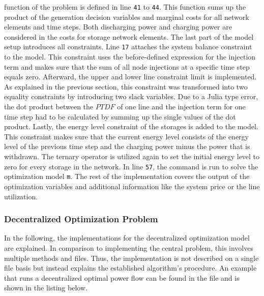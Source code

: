 function of the problem is defined in line \texttt{41} to \texttt{44}. This function sums up the product of the generation decision variables and marginal costs for all network elements and time steps. Both discharging power and charging power are considered in the costs for storage network elements. The last part of the model setup introduces all constraints. Line \texttt{17} attaches the system balance constraint to the model. This constraint uses the before-defined expression for the injection term and makes sure that the sum of all node injections at a specific time step equals zero. Afterward, the upper and lower line constraint limit is implemented. As explained in the previous section, this constraint was transformed into two equality constraints by introducing two slack variables. Due to a Julia type error, the dot product between the $PTDF$ of one line and the injection term for one time step had to be calculated by summing up the single values of the dot product. Lastly, the energy level constraint of the storages is added to the model. This constraint makes sure that the current energy level consists of the energy level of the previous time step and the charging power minus the power that is withdrawn. The ternary operator is utilized again to set the initial energy level to zero for every storage in the network. In line \texttt{57}, the command is run to solve the optimization model \lstinline[language=julia]{m}. The rest of the implementation covers the output of the optimization variables and additional information like the system price or the line utilization.


\subsubsection{Decentralized Optimization Problem}

In the following, the implementations for the decentralized optimization model are explained. In comparison to implementing the central problem, this involves multiple methods and files. Thus, the implementation is not described on a single file basis but instead explains the established algorithm's procedure. An example that runs a decentralized optimal power flow can be found in the file  and is shown in the listing below.



